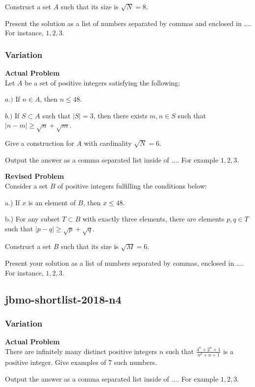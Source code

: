 Construct a set \( A \) such that its size is \( \sqrt{N} = 8 \).

Present the solution as a list of numbers separated by commas and enclosed in \(\boxed{...}\). For instance, \(\boxed{1, 2, 3}\).

\subsubsection{Variation}
\textbf{Actual Problem}\\
Let $A$ be a set of positive integers satisfying the following:

$a.)$ If $n \in A$, then $n \le 48$.

$b.)$ If $S \subset A$ such that $|S|=3$, then there exists $m,n \in S$ such that $|n-m| \ge \sqrt{n}+\sqrt{m}$.

Give a construction for $A$ with cardinality $\sqrt{N}=6$.

Output the answer as a comma separated list inside of $\boxed{...}$. For example $\boxed{1, 2, 3}$.

\textbf{Revised Problem}\\
Consider a set \( B \) of positive integers fulfilling the conditions below:

a.) If \( x \) is an element of \( B \), then \( x \leq 48 \).

b.) For any subset \( T \subset B \) with exactly three elements, there are elements \( p, q \in T \) such that \( |p-q| \geq \sqrt{p} + \sqrt{q} \).

Construct a set \( B \) such that its size is \( \sqrt{M} = 6 \).

Present your solution as a list of numbers separated by commas, enclosed in \(\boxed{...}\). For instance, \(\boxed{1, 2, 3}\).

\subsection{jbmo-shortlist-2018-n4}
\subsubsection{Variation}
\textbf{Actual Problem}\\
There are infinitely many distinct positive integers $n$ such that $\frac{4^n+2^n+1}{n^2 + n + 1}$ is a positive integer. Give examples of $7$ such numbers.

Output the answer as a comma separated list inside of $\boxed{...}$. For example $\boxed{1, 2, 3}$.

